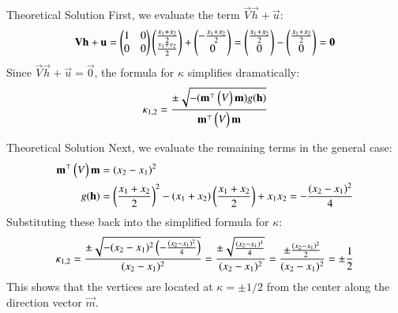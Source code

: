 \documentclass{beamer}
\begin{document}
\begin{frame}{Theoretical Solution}
First, we evaluate the term $\vec{V}\vec{h} + \vec{u}$:
\vspace{0.2cm}
\begin{align}
    \mathbf{V}\mathbf{h} + \mathbf{u} = \begin{pmatrix} 1 & 0 \\ 0 & 0 \end{pmatrix} \begin{pmatrix} \frac{x_1+x_2}{2} \\ \frac{y_1+y_2}{2} \end{pmatrix} + \begin{pmatrix} -\frac{x_1+x_2}{2} \\ 0 \end{pmatrix} = \begin{pmatrix}\frac{x_1+x_2}{2} \\ 0 \end{pmatrix} - \begin{pmatrix}\frac{x_1+x_2}{2} \\ 0 \end{pmatrix} = \mathbf{0}
\end{align}
Since $\vec{V}\vec{h} + \vec{u} = \vec{0}$, the formula for $\kappa$ simplifies dramatically:
\vspace{0.2cm}
\noindent
\begin{align}
    \kappa_{1,2} = \frac{\pm \sqrt{-(\mathbf{m}^{\top} \begin{pmatrix}V\end{pmatrix} \mathbf{m}) g(\mathbf{h})}}{\mathbf{m}^{\top} \begin{pmatrix}V\end{pmatrix} \mathbf{m}}
\end{align}
\end{frame}
\begin{frame}{Theoretical Solution}
Next, we evaluate the remaining terms in the general case:
\begin{align}
    \mathbf{m}^{\top} \begin{pmatrix}V\end{pmatrix} \mathbf{m} &= (x_2-x_1)^2 \\
    g(\mathbf{h}) &= \left(\frac{x_1+x_2}{2}\right)^2 - (x_1+x_2)\left(\frac{x_1+x_2}{2}\right) + x_1x_2 = -\frac{(x_2-x_1)^2}{4}
\end{align}
Substituting these back into the simplified formula for $\kappa$:
\vspace{0.2cm}
\noindent
\begin{align}
    \kappa_{1,2} = \frac{\pm \sqrt{-(x_2-x_1)^2 \left(-\frac{(x_2-x_1)^2}{4}\right)}}{(x_2-x_1)^2} = \frac{\pm \sqrt{\frac{(x_2-x_1)^4}{4}}}{(x_2-x_1)^2} = \frac{\pm \frac{(x_2-x_1)^2}{2}}{(x_2-x_1)^2} = \pm \frac{1}{2}
\end{align}
This shows that the vertices are located at $\kappa = \pm 1/2$ from the center along the direction vector $\vec{m}$.
\end{frame}
\end{document}
